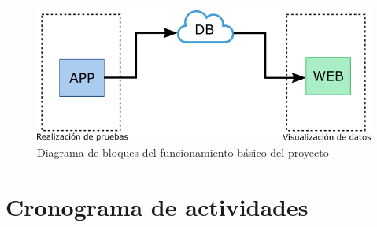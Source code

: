 \documentclass[12pt,oneside,a4paper]{article}
\begin{document}
\hline

\begin{figure}[H]
  \centering
  \includegraphics[width=15cm]{anteproyecto/figuras/tfg_diagramabloques_simple.png}
  \caption{Diagrama de bloques del funcionamiento básico del proyecto}
  \label{fig:ejemplo}
\end{figure}

\newpage

\section{Cronograma de actividades}
\hline
\end{document}
